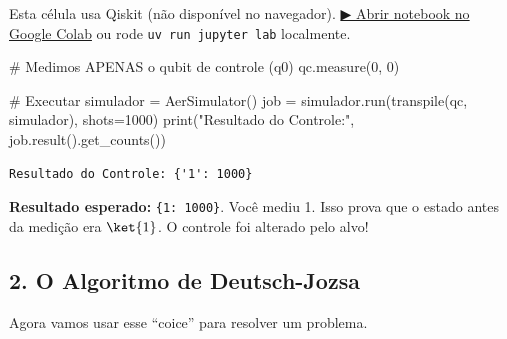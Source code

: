 \documentclass[
  brazilian,
]{report}
\newenvironment{Shaded}{\begin{snugshade}}{\end{snugshade}}
\newcommand{\BuiltInTok}[1]{\textcolor[rgb]{0.00,0.23,0.31}{#1}}
\newcommand{\CommentTok}[1]{\textcolor[rgb]{0.37,0.37,0.37}{#1}}
\newcommand{\DecValTok}[1]{\textcolor[rgb]{0.68,0.00,0.00}{#1}}
\newcommand{\NormalTok}[1]{\textcolor[rgb]{0.00,0.23,0.31}{#1}}
\newcommand{\OperatorTok}[1]{\textcolor[rgb]{0.37,0.37,0.37}{#1}}
\newcommand{\StringTok}[1]{\textcolor[rgb]{0.13,0.47,0.30}{#1}}
\begin{document}
\begin{tcolorbox}[enhanced jigsaw, arc=.35mm, bottomrule=.15mm, bottomtitle=1mm, breakable, colback=white, colbacktitle=quarto-callout-warning-color!10!white, colframe=quarto-callout-warning-color-frame, coltitle=black, left=2mm, leftrule=.75mm, opacityback=0, opacitybacktitle=0.6, rightrule=.15mm, title=\textcolor{quarto-callout-warning-color}{\faExclamationTriangle}\hspace{0.5em}{⚛️ Célula Qiskit --- execute no Colab ou localmente}, titlerule=0mm, toprule=.15mm, toptitle=1mm]

Esta célula usa Qiskit (não disponível no navegador).
\href{https://colab.research.google.com/github/maxwellamaral/aula-quantum/blob/main/notebooks/05-interference.ipynb}{▶
Abrir notebook no Google Colab} ou rode \texttt{uv\ run\ jupyter\ lab}
localmente.

\begin{Shaded}
\begin{Highlighting}[]


\CommentTok{\# Medimos APENAS o qubit de controle (q0)}
\NormalTok{qc.measure(}\DecValTok{0}\NormalTok{, }\DecValTok{0}\NormalTok{)}

\CommentTok{\# Executar}
\NormalTok{simulador }\OperatorTok{=}\NormalTok{ AerSimulator()}
\NormalTok{job }\OperatorTok{=}\NormalTok{ simulador.run(transpile(qc, simulador), shots}\OperatorTok{=}\DecValTok{1000}\NormalTok{)}
\BuiltInTok{print}\NormalTok{(}\StringTok{"Resultado do Controle:"}\NormalTok{, job.result().get\_counts())}
\end{Highlighting}
\end{Shaded}

\end{tcolorbox}

\begin{verbatim}
Resultado do Controle: {'1': 1000}
\end{verbatim}

\textbf{Resultado esperado:}
\texttt{\{\textquotesingle{}1\textquotesingle{}:\ 1000\}}. Você mediu 1.
Isso prova que o estado antes da medição era \(\ket{1}\). O controle foi
alterado pelo alvo!

\subsection{2. O Algoritmo de
Deutsch-Jozsa}\label{o-algoritmo-de-deutsch-jozsa}

Agora vamos usar esse ``coice'' para resolver um problema.
\end{document}
